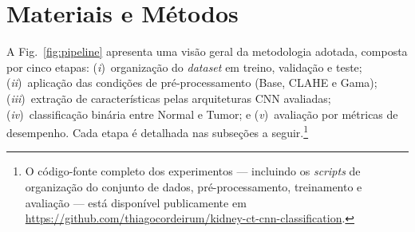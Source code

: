 \documentclass[conference]{IEEEtran}
\begin{document}
\section{Materiais e Métodos}

A Fig.~\ref{fig:pipeline} apresenta uma visão geral da metodologia adotada,
composta por cinco etapas: (\textit{i})~organização do \textit{dataset} em
treino, validação e teste; (\textit{ii})~aplicação das condições de
pré-processamento (Base, CLAHE e Gama); (\textit{iii})~extração de
características pelas arquiteturas CNN avaliadas; (\textit{iv})~classificação
binária entre Normal e Tumor; e (\textit{v})~avaliação por métricas de
desempenho. Cada etapa é detalhada nas subseções a seguir.\footnote{O
código-fonte completo dos experimentos --- incluindo os \textit{scripts} de
organização do conjunto de dados, pré-processamento, treinamento e avaliação
--- está disponível publicamente em
\url{https://github.com/thiagocordeirum/kidney-ct-cnn-classification}.}
\end{document}
